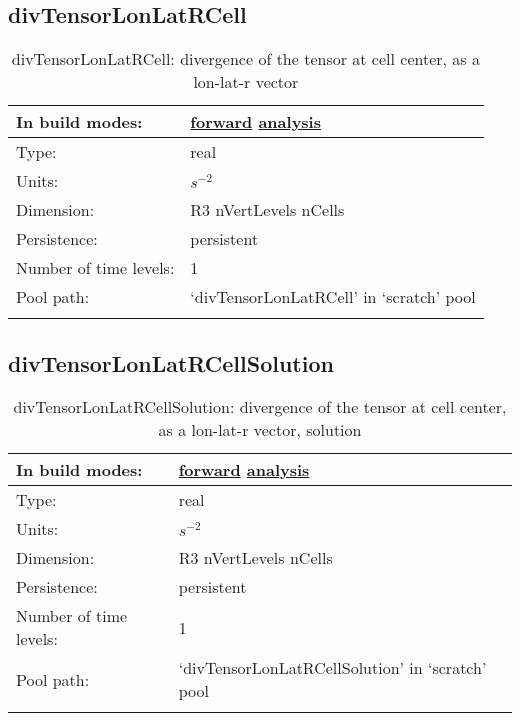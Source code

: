 \subsection[divTensorLonLatRCell]{divTensorLonLatRCell}
\label{subsec:var_sec_scratch_divTensorLonLatRCell}
\begin{center}
\begin{longtable}{| p{2.0in} | p{4.0in} |}
        \hline 
        In build modes: & \hyperref[subsec:forward_var_tab_scratch]{forward} \hyperref[subsec:analysis_var_tab_scratch]{analysis} \\
        \hline 
        Type: & real \\
        \hline 
        Units: & $s^{-2}$ \\
        \hline 
        Dimension: & R3 nVertLevels nCells \\
        \hline 
        Persistence: & persistent \\
        \hline 
        Number of time levels: & 1 \\
        \hline 
            Pool path: & `divTensorLonLatRCell' in `scratch' pool \\
		 \hline 
    \caption{divTensorLonLatRCell: divergence of the tensor at cell center, as a lon-lat-r vector}
\end{longtable}
\end{center}
\subsection[divTensorLonLatRCellSolution]{divTensorLonLatRCellSolution}
\label{subsec:var_sec_scratch_divTensorLonLatRCellSolution}
\begin{center}
\begin{longtable}{| p{2.0in} | p{4.0in} |}
        \hline 
        In build modes: & \hyperref[subsec:forward_var_tab_scratch]{forward} \hyperref[subsec:analysis_var_tab_scratch]{analysis} \\
        \hline 
        Type: & real \\
        \hline 
        Units: & $s^{-2}$ \\
        \hline 
        Dimension: & R3 nVertLevels nCells \\
        \hline 
        Persistence: & persistent \\
        \hline 
        Number of time levels: & 1 \\
        \hline 
            Pool path: & `divTensorLonLatRCellSolution' in `scratch' pool \\
		 \hline 
    \caption{divTensorLonLatRCellSolution: divergence of the tensor at cell center, as a lon-lat-r vector, solution}
\end{longtable}
\end{center}
